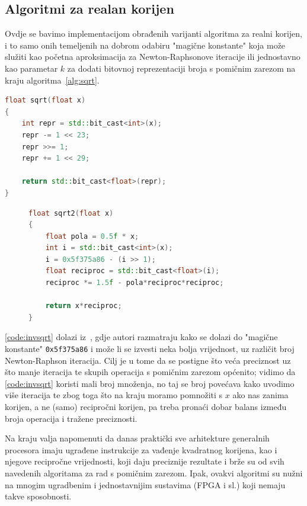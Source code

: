 \documentclass[12pt]{scrartcl}
\begin{document}
\subsection{Algoritmi za realan korijen}
Ovdje se bavimo implementacijom obrađenih varijanti algoritma za realni korijen, i to samo onih temeljenih na dobrom odabiru "magične konstante"
koja može služiti kao početna aproksimacija za Newton-Raphsonove iteracije ili jednostavno kao parametar $k$ za dodati bitovnoj reprezentaciji
broja s pomičnim zarezom na kraju algoritma~\ref{alg:sqrt}.
\begin{lstlisting}[language=C++, label=code:sqrt, caption=C++20 implementacija direktne aproksimacije realnog korijena]
float sqrt(float x)
{
    int repr = std::bit_cast<int>(x);
    repr -= 1 << 23;
    repr >>= 1;
    repr += 1 << 29;

    return std::bit_cast<float>(repr);
}
\end{lstlisting}

\begin{figure}[h]
\begin{lstlisting}[language=C++, label=code:invsqrt, caption=C++20 implementacija aproksimacije korijena preko recipročne vrijednosti]
float sqrt2(float x)
{
    float pola = 0.5f * x;
    int i = std::bit_cast<int>(x);
    i = 0x5f375a86 - (i >> 1);
    float reciproc = std::bit_cast<float>(i);
    reciproc *= 1.5f - pola*reciproc*reciproc;

    return x*reciproc;
}
\end{lstlisting}
\end{figure}

\autoref{code:invsqrt} dolazi iz~\cite{walczyk2018improving}, gdje autori razmatraju kako se dolazi do "magične konstante"
\verb|0x5f375a86| i može li se izvesti neka bolja vrijednost, uz različit broj Newton-Raphson iteracija. Cilj je u tome da se postigne što
veća preciznost uz što manje iteracija te skupih operacija s pomičnim zarezom općenito; vidimo da \autoref{code:invsqrt} koristi mali
broj množenja, no taj se broj povećava kako uvodimo više iteracija te zbog toga što na kraju moramo pomnožiti s $x$ ako nas zanima korijen, a ne
(samo) recipročni korijen, pa treba pronaći dobar balans između broja operacija i tražene preciznosti.

Na kraju valja napomenuti da danas praktički sve arhitekture generalnih procesora imaju ugrađene instrukcije za vađenje kvadratnog korijena, kao
i njegove recipročne vrijednosti, koji daju preciznije rezultate i brže su od svih navedenih algoritama za rad s pomičnim zarezom. Ipak, ovakvi
algoritmi su nužni na mnogim ugradbenim i jednostavnijim sustavima (FPGA i sl.) koji nemaju takve sposobnosti.
\end{document}
